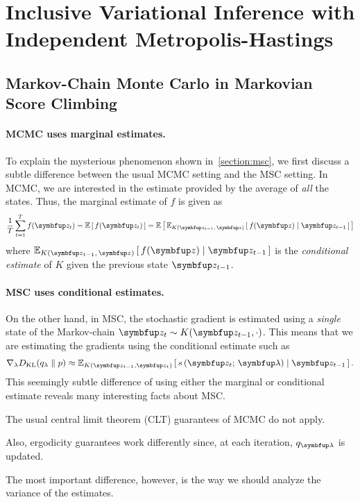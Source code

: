 
\section{Inclusive Variational Inference with Independent Metropolis-Hastings}

\subsection{Markov-Chain Monte Carlo in Markovian Score Climbing}\label{section:msc_mcmc}
\paragraph{MCMC uses marginal estimates.}
To explain the mysterious phenomenon shown in~\cref{section:msc}, we first discuss a subtle difference between the usual MCMC setting and the MSC setting.
In MCMC, we are interested in the estimate provided by the average of \textit{all} the states.
Thus, the marginal estimate of \(f\) is given as
\begin{align}
  \frac{1}{T} \sum^{T}_{t=1} f(\vz_t) = \E{f(\vz_t)} = \E{\Esub{K(\vz_{t-1},\,\vz)}{ f(\vz) \mid \vz_{t-1}}}
\end{align}
where \(\Esub{K(\vz_{t-1},\,\vz)}{ f(\vz) \mid \vz_{t-1}}\) is the \textit{conditional estimate} of \(K\) given the previous state \(\vz_{t-1}\).

\paragraph{MSC uses conditional estimates.}
On the other hand, in MSC, the stochastic gradient is estimated using a \textit{single} state of the Markov-chain \(\vz_t \sim K(\vz_{t-1}, \cdot)\).
This means that we are estimating the gradients using the conditional estimate such as
\begin{align}
  \nabla_{\lambda} \DKL{q_{\lambda}}{p} \approx \Esub{K(\vz_{t-1},\vz_t)}{s\,(\vz_t;\, \vlambda) \mid \vz_{t-1}}.
\end{align}
This seemingly subtle difference of using either the marginal or conditional estimate reveals many interesting facts about MSC.
\begin{enumerate*}[label=(\roman*)]
\item The usual central limit theorem (CLT) guarantees of MCMC do not apply.
\item Also, ergodicity guarantees work differently since, at each iteration, \(q_{\vlambda}\) is updated.
\end{enumerate*}
The most important difference, however, is the way we should analyze the variance of the estimates.

